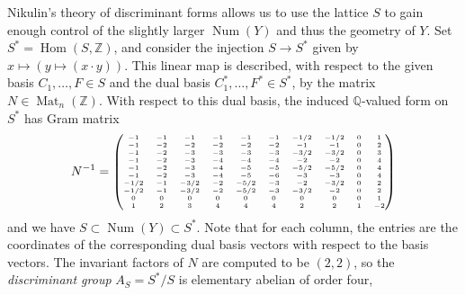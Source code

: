 \documentclass[oneside, 12pt]{amsart}
\theoremstyle{definition}
\theoremstyle{remark}
\newcommand{\ZZ}{\mathbb{Z}}
\newcommand{\QQ}{\mathbb{Q}}
\newcommand{\Hom}{\operatorname{Hom}}
\newcommand{\Mat}{\operatorname{Mat}}
\newcommand{\Num}{\operatorname{Num}}
\newcommand{\ra}{\rightarrow}
\begin{document}
Nikulin's theory of discriminant forms \cite{Nikulin 1980} allows us to use the lattice $S$ to gain enough control of the slightly larger  $\Num(Y)$
and thus the geometry of  $Y$.
Set $S^*=\Hom(S,\ZZ)$, and consider the   injection $ S\ra S^*$ given by $x\mapsto (y\mapsto (x\cdot y))$.
This linear map is described, with respect to the given basis $C_1,\ldots,F\in S$ and the   dual basis $C_1^*,\ldots,F^*\in S^*$, 
by the matrix    $N\in\Mat_n(\ZZ)$.
With respect to this dual basis, the  induced $\QQ$-valued form   on $S^*$ has Gram matrix 
\begin{equation}
\label{gram matrix}
N^{-1}=
{\tiny
\begin{pmatrix} 
  -1   &-1   &-1   &-1   &-1   &-1 &-1/2 &-1/2   & 0   & 1\\
  -1   &-2   &-2   &-2   &-2   &-2  & -1 &  -1   & 0   & 2\\
  -1   &-2   &-3   &-3   &-3   &-3 &-3/2 &-3/2   & 0   & 3\\
  -1   &-2   &-3   &-4  & -4   &-4 &  -2 &  -2   & 0   & 4\\
  -1   &-2   &-3   &-4   &-5   &-5 &-5/2 &-5/2   & 0   & 4\\
  -1   &-2   &-3   &-4   &-5   &-6 &  -3 &  -3   & 0   & 4\\
-1/2   &-1 &-3/2   &-2 &-5/2   &-3 &  -2 &-3/2   & 0   & 2\\
-1/2   &-1 &-3/2   &-2 &-5/2   &-3 &-3/2 &  -2   & 0   & 2\\
   0   & 0   & 0   & 0  &  0   & 0 &   0 &   0   & 0   & 1\\
   1   & 2   & 3   & 4  & 4    &4  &  2  &  2    & 1   &-2
\end{pmatrix}
}
\end{equation}
and we have $S\subset\Num(Y)\subset S^*$.  Note that for each  column, the entries are the coordinates of the corresponding
dual basis vectors with respect to the basis vectors.
%
%
The  invariant factors  of $N$ are  computed to be $(2,2)$, so the \emph{discriminant group} $A_S=S^*/S$ is elementary abelian of order four,
\end{document}
